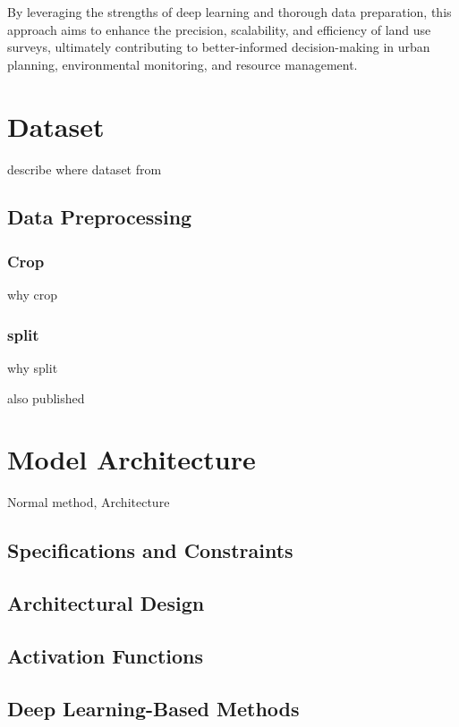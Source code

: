 \documentclass[conference]{IEEEtran}
\begin{document}
By leveraging the strengths of deep learning and thorough data preparation, this approach aims to enhance the precision, scalability, and efficiency of land use surveys, ultimately contributing to better-informed decision-making in urban planning, environmental monitoring, and resource management.



\section{Dataset}
describe where dataset from
\subsection{Data Preprocessing}
\subsubsection{Crop}
why crop

\subsubsection{split}
why split

also published

\section{Model Architecture}

Normal method, Architecture

\subsection*{Specifications and Constraints}
\subsection{Architectural Design}
\subsection{Activation Functions}


\subsection{Deep Learning-Based Methods}
\end{document}
